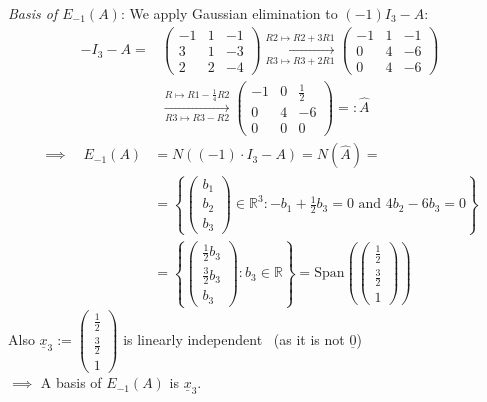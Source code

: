 \documentclass[
  12pt,
  a4paper,
  twoside]{article}
\theoremstyle{plain}
\theoremstyle{definition}
\begin{document}
\emph{Basis of \(E_{-1}(A)\)}: We apply Gaussian elimination to \((-1)I_3 -A\):
\begin{align*}
-I_3-A =& \begin{pmatrix} -1 & 1 & -1 \\ 3 & 1 & -3 \\ 2 & 2 & -4 \end{pmatrix}
\xrightarrow[R3 \mapsto R3 + 2R1]{R2 \mapsto R2 + 3 R1}
\begin{pmatrix} -1 & 1 & -1 \\ 0 & 4 & -6 \\ 0 & 4 & -6 \end{pmatrix}\\
& \xrightarrow[R3 \mapsto R3 - R2]{R \mapsto R1 - \frac{1}{4}R2}
\begin{pmatrix} -1 & 0 & \frac{1}{2} \\ 0 & 4 & -6 \\ 0 & 0 & 0 \end{pmatrix}
=: \hat{A}
\end{align*}
\begin{align*}
\implies\quad E_{-1}(A) &= N((-1)\cdot I_3-A) = N(\hat{A}) = \\
&= \left\{ \begin{pmatrix} b_{1} \\ b_{2} \\ b_{3} \end{pmatrix} \in \mathbb{R}^{3} : -b_{1} + \frac{1}{2}b_{3} = 0 \text{ and } 4b_{2} - 6b_{3} =0 \right\}
\\ &= \left\{ \begin{pmatrix} \frac{1}{2}b_{3} \\ \frac{3}{2}b_{3} \\ b_{3} \end{pmatrix} : b_{3} \in \mathbb{R} \right\} = \mathrm{Span} \left( \begin{pmatrix} \frac{1}{2} \\ \frac{3}{2} \\ 1 \end{pmatrix} \right)
\end{align*}
Also \(\underline{x}_{3} := \begin{pmatrix} \frac{1}{2} \\ \frac{3}{2} \\ 1 \end{pmatrix}\) is linearly independent \hfill~{(as it is not \(\underline{0}\))}\\
\(\implies\) A basis of \(E_{-1}(A)\) is \(\underline{x}_3\).
\end{document}
